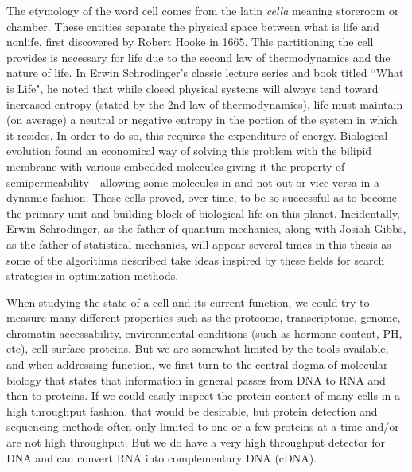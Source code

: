 \par{
The etymology of the word cell comes from the latin \textit{cella} meaning storeroom or chamber. These entities separate the physical space between what is life and nonlife, first discovered by Robert Hooke in 1665\cite{Hooke}. This partitioning the cell provides is necessary for life due to the second law of thermodynamics and the nature of life. In Erwin Schrodinger's classic lecture series and book titled ``What is Life"\cite{whatislife}, he noted that while closed physical systems will always tend toward increased entropy (stated by the 2nd law of thermodynamics\cite{thermodynamics1}\cite{thermodynamics2}\cite{maxwell}), life must maintain (on average) a neutral or negative entropy in the portion of the system in which it resides\cite{informationtheorylife}\cite{astrobiology}\cite{extremalities}. In order to do so, this requires the expenditure of energy. Biological evolution found an economical way of solving this problem with the bilipid membrane with various embedded molecules giving it the property of semipermeability---allowing some molecules in and not out or vice versa in a dynamic fashion. These cells proved, over time, to be so successful as to become the primary unit and building block of biological life on this planet. Incidentally, Erwin Schrodinger, as the father of quantum mechanics, along with Josiah Gibbs, as the father of statistical mechanics, will appear several times in this thesis as some of the algorithms described take ideas inspired by these fields for search strategies in optimization methods.
} \\

\par{
When studying the state of a cell and its current function, we could try to measure many different properties such as the proteome, transcriptome, genome, chromatin accessability, environmental conditions (such as hormone content, PH, etc), cell surface proteins. But we are somewhat limited by the tools available, and when addressing function, we first turn to the central dogma of molecular biology\cite{centraldogma} that states that information in general passes from DNA to RNA and then to proteins. If we could easily inspect the protein content of many cells in a high throughput fashion, that would be desirable, but protein detection and sequencing methods often only limited to one or a few proteins at a time and/or are not high throughput\cite{immunohistochemistry}\cite{multiIHC}\cite{westernblot}\cite{western2}\cite{multimassspec}\cite{ionbeam}\cite{cellIHC}\cite{proteinsequencing}. But we do have a very high throughput detector for DNA and can convert RNA into complementary DNA (cDNA).
}

